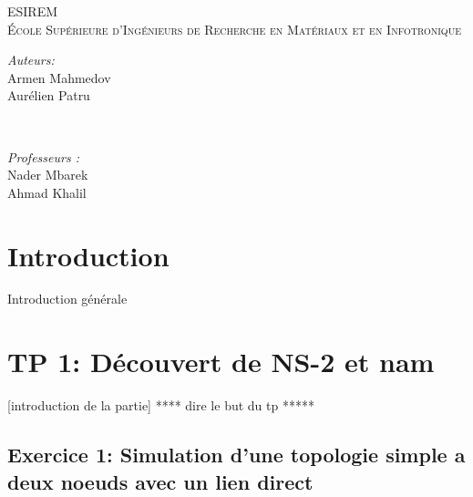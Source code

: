 \documentclass[11pt]{article}
\begin{document}
\begin{titlepage}
	\vfill 
	\begin{center}
        \textsc{\large
        	ESIREM \\
			École Supérieure d'Ingénieurs de Recherche en Matériaux et en Infotronique\\       	
			[2cm]
		}
	\end{center}

	\begin{minipage}{0.5\textwidth}
		\begin{flushleft} \large
			\emph{Auteurs:}\\
			Armen Mahmedov \\
			Aurélien Patru
		\end{flushleft}
	\end{minipage}
	~
	\begin{minipage}{0.5\textwidth}
		\begin{flushright}\large
			\emph{Professeurs :} \\
			Nader Mbarek \\
			Ahmad Khalil
		\end{flushright}
	\end{minipage}
        
\end{titlepage}
  
\newpage
\strut
\newpage

\tableofcontents

\pagebreak

\listoffigures

\pagebreak


\section*{Introduction}
Introduction générale 

\pagebreak


\section{TP 1: Découvert de NS-2 et nam}
[introduction de la partie] **** dire le but du tp  *****

\subsection{Exercice 1: Simulation d'une topologie simple a deux noeuds avec un lien direct}
\end{document}
